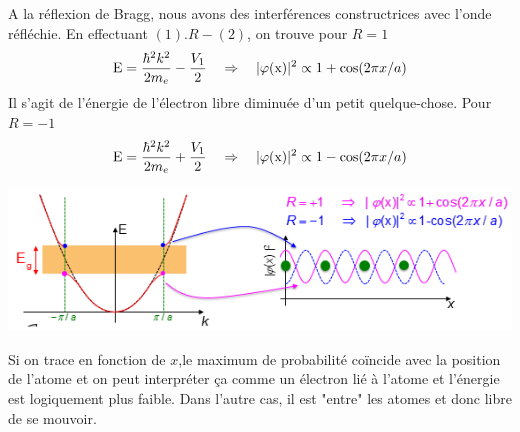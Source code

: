 	A la réflexion de Bragg, nous avons des interférences constructrices avec l'onde réfléchie.
	En effectuant $(1).R-(2)$, on trouve pour $R=1$
	\begin{equation}
	{\rm{E}} = \frac{{{\hbar ^2}{k^2}}}{{2{m_e}}} - \frac{{{V_1}}}{2}\quad \Rightarrow\quad
	|\varphi {\rm{(x)}}{{\rm{|}}^{\rm{2}}} \propto 1 + {\rm{cos(2}}\pi x/a{\rm{)}}
	\end{equation}
	Il s'agit de l'énergie de l'électron libre diminuée d'un petit quelque-chose. Pour $R=-1$
	\begin{equation}
	{\rm{E}} = \frac{{{\hbar ^2}{k^2}}}{{2{m_e}}} + \frac{{{V_1}}}{2}\quad\Rightarrow\quad
	{\rm{ }}|\varphi {\rm{(x)}}{{\rm{|}}^{\rm{2}}} \propto {\rm{1 - cos(2}}\pi x/a{\rm{)}}
	\end{equation}
	\begin{center}
	\includegraphics[scale=0.76]{ch5/image5}
	\end{center}
	Si on trace en fonction de $x$,le maximum de probabilité coïncide avec la position de l'atome 
	et on peut interpréter ça comme un électron lié à l'atome et l'énergie est logiquement plus 
	faible. Dans l'autre cas, il est "entre" les atomes et donc libre de se mouvoir.\\
	
